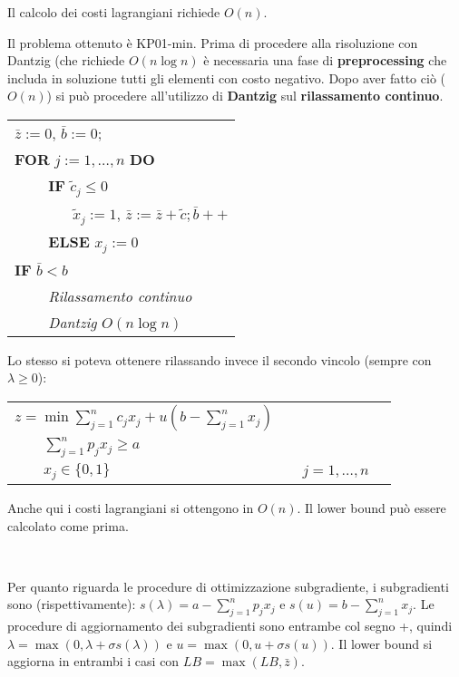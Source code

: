 \documentclass[11pt]{book}
\begin{document}
Il calcolo dei costi lagrangiani richiede $O(n)$.

Il problema ottenuto \`e KP01-min. Prima di procedere alla risoluzione
con Dantzig (che richiede $O(n \log n)$ \`e necessaria una fase di
\textbf{preprocessing} che includa in soluzione tutti gli elementi con
costo negativo. Dopo aver fatto ci\`o ($O(n)$) si pu\`o procedere
all'utilizzo di \textbf{Dantzig} sul \textbf{rilassamento continuo}.

\vspace{20pt}
\begin{tabular}{l}
$\bar{z}:= 0$, $\bar{b} := 0$;\\
\textbf{FOR} $j:=1,\dots,n$ \textbf{DO}\\
$\qquad$ \textbf{IF} $\tilde{c}_j \leq 0$\\
$\qquad\qquad \tilde{x}_j := 1$, $\bar{z}:=\bar{z}+\tilde{c};
\bar{b}++$\\
$\qquad$ \textbf{ELSE} $x_j := 0$\\
\textbf{IF} $\bar{b} < b$\\
$\qquad$ \textit{Rilassamento continuo}\\
$\qquad$ \textit{Dantzig} $O(n \log n)$\\
\end{tabular}
\vspace{20pt}

Lo stesso si poteva ottenere rilassando invece il secondo vincolo
(sempre con $\lambda \geq 0$):

\begin{center}
\begin{tabular}{lp{2cm}ll}
  $z = \min \sum\limits_{j=1}^n c_jx_j + u (b - \sum\limits_{j=1}^n x_j)$ & & & \\
  $\qquad \sum\limits_{j = 1}^n p_jx_j \geq a$ & & & \\
  $\qquad x_j \in\{0,1\}$ & & $j = 1,\dots,n$ & \\
\end{tabular}
\end{center}

Anche qui i costi lagrangiani si ottengono in $O(n)$. Il lower bound
pu\`o essere calcolato come prima.

\

Per quanto riguarda le procedure di ottimizzazione subgradiente, i
subgradienti sono (rispettivamente): $s(\lambda) = a -
\sum\limits_{j=1}^n p_j x_j$ e $s(u) = b - \sum\limits_{j=1}^n x_j$.
Le procedure di aggiornamento dei subgradienti sono entrambe col segno
+, quindi $\lambda = \max(0, \lambda + \sigma s(\lambda))$ e $u =
\max(0, u + \sigma s(u))$. Il lower bound si aggiorna in entrambi i
casi con $LB = \max (LB, \bar{z})$.
\end{document}
